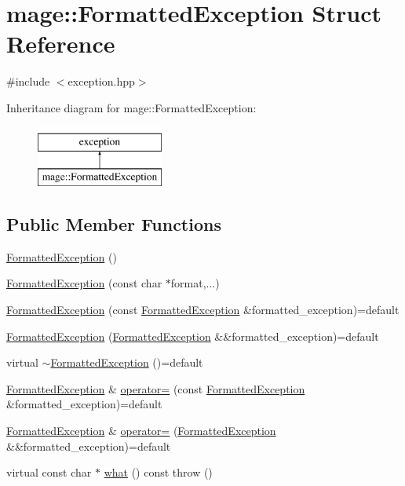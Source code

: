 \hypertarget{structmage_1_1_formatted_exception}{}\section{mage\+:\+:Formatted\+Exception Struct Reference}
\label{structmage_1_1_formatted_exception}


{\ttfamily \#include $<$exception.\+hpp$>$}

Inheritance diagram for mage\+:\+:Formatted\+Exception\+:\begin{figure}[H]
\begin{center}
\leavevmode
\includegraphics[height=2.000000cm]{structmage_1_1_formatted_exception}
\end{center}
\end{figure}
\subsection*{Public Member Functions}
\begin{DoxyCompactItemize}
\item 
\hyperlink{structmage_1_1_formatted_exception_a77b82a969ec33a3aacec74a5adc4ab8b}{Formatted\+Exception} ()
\item 
\hyperlink{structmage_1_1_formatted_exception_a3fe833a49052a2db99c023b1b1d43621}{Formatted\+Exception} (const char $\ast$format,...)
\item 
\hyperlink{structmage_1_1_formatted_exception_ac42aa4b8dcd15a4f88fc578fec5b11db}{Formatted\+Exception} (const \hyperlink{structmage_1_1_formatted_exception}{Formatted\+Exception} \&formatted\+\_\+exception)=default
\item 
\hyperlink{structmage_1_1_formatted_exception_ac47ff28101bb2660f40211d47afd6bf9}{Formatted\+Exception} (\hyperlink{structmage_1_1_formatted_exception}{Formatted\+Exception} \&\&formatted\+\_\+exception)=default
\item 
virtual \hyperlink{structmage_1_1_formatted_exception_a074a2e845b0fa0d57dfeab63ee0cb1f5}{$\sim$\+Formatted\+Exception} ()=default
\item 
\hyperlink{structmage_1_1_formatted_exception}{Formatted\+Exception} \& \hyperlink{structmage_1_1_formatted_exception_a36b95a1d6ee656db750f9f7c24a0f69d}{operator=} (const \hyperlink{structmage_1_1_formatted_exception}{Formatted\+Exception} \&formatted\+\_\+exception)=default
\item 
\hyperlink{structmage_1_1_formatted_exception}{Formatted\+Exception} \& \hyperlink{structmage_1_1_formatted_exception_ae35ad9e81efe8ed385792854036b4a14}{operator=} (\hyperlink{structmage_1_1_formatted_exception}{Formatted\+Exception} \&\&formatted\+\_\+exception)=default
\item 
virtual const char $\ast$ \hyperlink{structmage_1_1_formatted_exception_a8fb8b53ee8d8cb73ac200bca84c067b2}{what} () const  throw ()
\end{DoxyCompactItemize}
